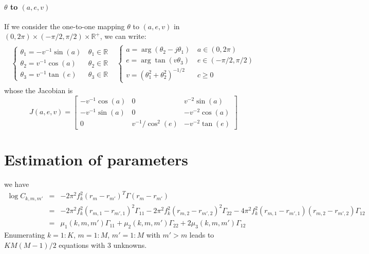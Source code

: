 \documentclass[a4paper, 12pt]{report}
\begin{document}
\subsubsection{$\theta$ to $(a,e,v)$ }
If we consider the one-to-one mapping $\theta$ to $(a,e,v)$ in $(0,2\pi)\times(-\pi/2,\pi/2)\times\mathds{R}^+$, we can write:
\begin{eqnarray*}
\begin{array}{cc}
 \left\{
 \begin{array}{ll}
 \theta_{1}=-v^{-1} \sin(a)&\, \theta_{1}\in\mathds{R}
 \\
 \theta_{2}=v^{-1}  \cos(a)&\,\theta_{2}\in\mathds{R}
 \\
 \theta_{3}=v^{-1}\tan(e)&\, \theta_{3}\in\mathds{R}
 \end{array}\right.
&
 \left\{
 \begin{array}{ll}
 a=\arg(\theta_{2}-j \theta_{1})& \, a\in(0,2\pi)
  \\
e=\arg\tan(v\theta_{3})& \,e\in(-\pi/2,\pi/2)
 \\
 v=(\theta_{1}^{2}+ \theta_{2}^{2})^{-1/2}& \, c \geq 0
 \end{array}\right.
\end{array}
\end{eqnarray*}
whose the Jacobian is
\begin{equation}
 \label{eq:jacobianaecv2theta}
 J(a,e,v)
 = 
 \begin{bmatrix}
-v^{-1}\cos(a)&0&v^{-2}\sin(a)
\\
-v^{-1}\sin(a)&0&-v^{-2}\cos(a)
\\
0&v^{-1}/\cos^2(e)&-v^{-2}\tan(e)
\end{bmatrix}
\end{equation}
\chapter{Estimation of parameters}
we have 
\begin{eqnarray*}
 \log C_{k,m,m'} &=&-2\pi^{2} f_{k}^{2}(r_{m}-r_{m'})^{T}\Gamma(r_{m}-r_{m'})
 \\
 &=&
-2\pi^{2} f_{k}^{2}(r_{m,1}-r_{m',1})^{2}\Gamma_{11}
-2\pi^{2} f_{k}^{2}(r_{m,2}-r_{m',2})^{2}\Gamma_{22}
-4\pi^{2} f_{k}^{2}(r_{m,1}-r_{m',1})(r_{m,2}-r_{m',2})\Gamma_{12}
\\
&=&
\mu_{1}(k,m,m')\Gamma_{11}
+\mu_{2}(k,m,m')\Gamma_{22}
+2\mu_{3}(k,m,m')\Gamma_{12}
\end{eqnarray*}
Enumerating $k=1:K$, $m=1:M$, $m'=1:M$ with $m'>m$ leads to $KM(M-1)/2$ equations with 3 unknowns.
\end{document}
